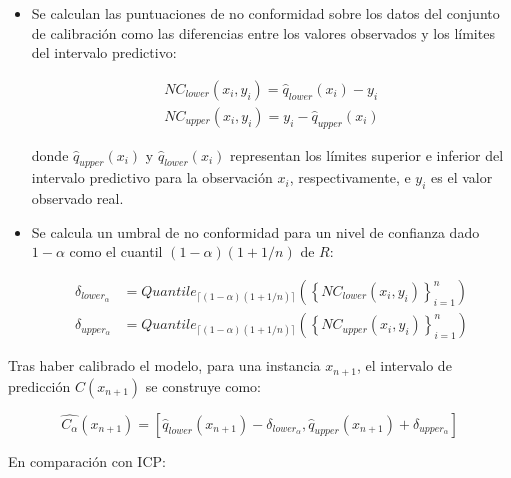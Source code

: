 \begin{itemize}
    \item Se calculan las puntuaciones de no conformidad sobre los datos del conjunto de calibración como las diferencias entre los valores observados y los límites del intervalo predictivo:
    
    \begin{equation*}
    \begin{split}
        NC_{lower}(x_i,y_i) = \hat{q}_{lower}(x_i) - y_i \\
        NC_{upper}(x_i,y_i) = y_i - \hat{q}_{upper}(x_i)  
    \end{split}
    \end{equation*}

    donde $\hat{q}_{upper}(x_i)$ y $\hat{q}_{lower}(x_i)$ representan los límites superior e inferior del intervalo predictivo para la observación $x_i$, respectivamente, e $y_i$ es el valor observado real.

    \item Se calcula un umbral de no conformidad para un nivel de confianza dado $1-\alpha$ como el cuantil $(1-\alpha)(1+1/n)$ de $R$:

    \begin{equation*}
    \begin{split}
        \delta_{lower_\alpha} &= Quantile_{ \lceil  (1-\alpha) (1 + 1/n)  \rceil } ( \left\{ NC_{lower}(x_i,y_i) \right\}_{i=1}^n  ) \\
        \delta_{upper_\alpha} &= Quantile_{ \lceil  (1-\alpha) (1 + 1/n)  \rceil } ( \left\{ NC_{upper}(x_i,y_i) \right\}_{i=1}^n  )
    \end{split}
    \end{equation*}

\end{itemize}

Tras haber calibrado el modelo, para una instancia $x_{n+1}$, el intervalo de predicción $C(x_{n+1})$ se
construye como:

$$
\hat{C_\alpha}(x_{n+1}) = 
        \left[ 
            \hat{q}_{lower}(x_{n+1}) - \delta_{lower_\alpha}, 
            \hat{q}_{upper}(x_{n+1}) + \delta_{upper_\alpha}
        \right]
$$

En comparación con \acrshort{ICP}:

